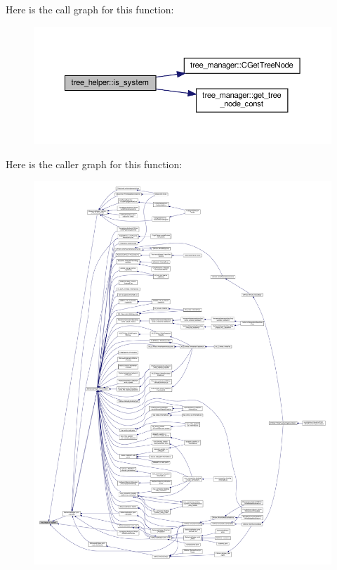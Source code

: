 Here is the call graph for this function\+:
\nopagebreak
\begin{figure}[H]
\begin{center}
\leavevmode
\includegraphics[width=350pt]{d7/d99/classtree__helper_a40fcd51b5a839f80fc2120307e240d39_cgraph}
\end{center}
\end{figure}
Here is the caller graph for this function\+:
\nopagebreak
\begin{figure}[H]
\begin{center}
\leavevmode
\includegraphics[width=350pt]{d7/d99/classtree__helper_a40fcd51b5a839f80fc2120307e240d39_icgraph}
\end{center}
\end{figure}
\mbox{\label{classtree__helper_ad9f5cee17052b3d02aa3b4a6bd87975d}} 
